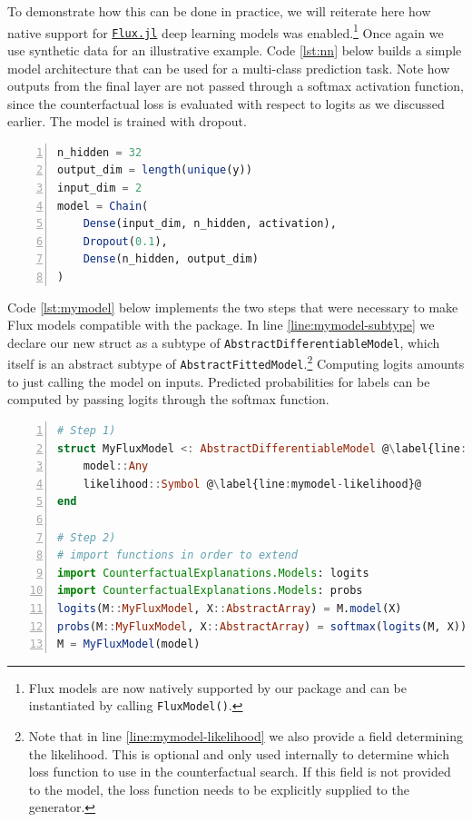 \documentclass{juliacon}
\begin{document}
To demonstrate how this can be done in practice, we will reiterate here
how native support for \href{https://fluxml.ai/}{\texttt{Flux.jl}}
\autocite{innes2018flux} deep learning models was enabled.\footnote{Flux
  models are now natively supported by our package and can be
  instantiated by calling \texttt{FluxModel()}.} Once again we use
synthetic data for an illustrative example. Code \ref{lst:nn} below
builds a simple model architecture that can be used for a multi-class
prediction task. Note how outputs from the final layer are not passed
through a softmax activation function, since the counterfactual loss is
evaluated with respect to logits as we discussed earlier. The model is
trained with dropout.

\begin{lstlisting}[language=Julia, escapechar=@, numbers=left, label={lst:nn}, caption={A simple neural network model.}]
n_hidden = 32
output_dim = length(unique(y))
input_dim = 2
model = Chain(
    Dense(input_dim, n_hidden, activation),
    Dropout(0.1),
    Dense(n_hidden, output_dim)
)  
\end{lstlisting}

Code \ref{lst:mymodel} below implements the two steps that were
necessary to make Flux models compatible with the package. In line
\ref{line:mymodel-subtype} we declare our new struct as a subtype of
\texttt{AbstractDifferentiableModel}, which itself is an abstract
subtype of \texttt{AbstractFittedModel}.\footnote{Note that in line
  \ref{line:mymodel-likelihood} we also provide a field determining the
  likelihood. This is optional and only used internally to determine
  which loss function to use in the counterfactual search. If this field
  is not provided to the model, the loss function needs to be explicitly
  supplied to the generator.} Computing logits amounts to just calling
the model on inputs. Predicted probabilities for labels can be computed
by passing logits through the softmax function.

\begin{lstlisting}[language=Julia, escapechar=@, numbers=left, label={lst:mymodel}, caption={A wrapper for Flux models.}]
# Step 1)
struct MyFluxModel <: AbstractDifferentiableModel @\label{line:mymodel-subtype}@
    model::Any
    likelihood::Symbol @\label{line:mymodel-likelihood}@
end

# Step 2)
# import functions in order to extend
import CounterfactualExplanations.Models: logits
import CounterfactualExplanations.Models: probs 
logits(M::MyFluxModel, X::AbstractArray) = M.model(X)
probs(M::MyFluxModel, X::AbstractArray) = softmax(logits(M, X))
M = MyFluxModel(model)
\end{lstlisting}
\end{document}
